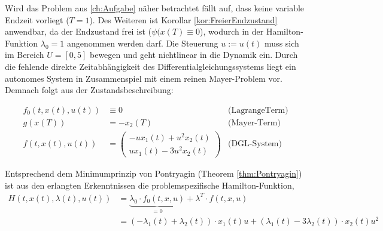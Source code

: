 Wird das Problem aus \autoref{ch:Aufgabe} näher betrachtet fällt auf, dass keine variable Endzeit vorliegt ($T=1$). Des Weiteren ist Korollar \ref{kor:FreierEndzustand} anwendbar, da der Endzustand  frei ist ($\psi(x(T) \equiv  0 $), wodurch in der Hamilton-Funktion $\lambda_0 = 1$  angenommen werden darf. Die Steuerung $u:= u(t)$ muss sich im Bereich $U = [0,5]$ bewegen und geht nichtlinear in die Dynamik ein. Durch die fehlende direkte Zeitabhängigkeit des Differentialgleichungssystems liegt ein autonomes System in Zusammenspiel mit einem reinen Mayer-Problem vor. Demnach folgt aus der Zustandsbeschreibung:

\begin{align*}
	f_0(t,x(t),u(t))  &\equiv 0 	&\text{(LagrangeTerm)}\\
	g(x(T)) &= -x_2(T) &\text{(Mayer-Term)}\\
	f (t,x(t),u(t))		&= \left(\begin{array}{c} 		-ux_1(t)+u^2x_2(t)\\ 
																ux_1(t) - 3u^2x_2(t) \end{array}\right)&\text{(DGL-System)}
\end{align*}
		
Entsprechend dem Minimumprinzip von Pontryagin (Theorem \ref{thm:Pontryagin}) ist aus den erlangten Erkenntnissen die problemspezifische Hamilton-Funktion,						
\begin{align}
	H(t,x(t),\lambda(t),u(t)) &=  \underbrace{\lambda_0  \cdot f_0(t,x,u)}_{=0}+ \lambda^T\cdot f(t,x,u)\\
										 &=  (- \lambda_1(t) +  \lambda_2(t))\cdot x_1(t) u + (\lambda_1(t) -  3 \lambda_2(t)) \cdot  x_2(t)u^2
\end{align}

